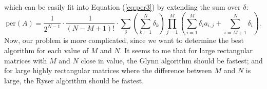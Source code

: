 \documentclass{article}
\begin{document}
which can be easily fit into Equation (\ref{eq:per3}) by extending the sum over $\delta$:
\begin{equation} \label{eq:rectper3}
    \text{per}(A) = \frac{1}{2^{N-1}} \cdot \frac{1}{\left(N - M + 1\right)!} \cdot \sum_{\delta}{
        \left(\sum_{k=1}^N{\delta_k}\right)
        \prod_{j=1}^M{\left(\sum_{i=1}^M{\delta_i a_{i,j}} + \sum_{i=M+1}^N{\delta_i}\right)}
    }.
\end{equation}
Now, our problem is more complicated, since we want to determine the best algorithm for each value
of $M$ and $N$. It seems to me that for large rectangular matrices with $M$ and $N$ close in value,
the Glynn algorithm should be fastest; and for large highly rectangular matrices where the
difference between $M$ and $N$ is large, the Ryser algorithm should be fastest.



\end{document}
